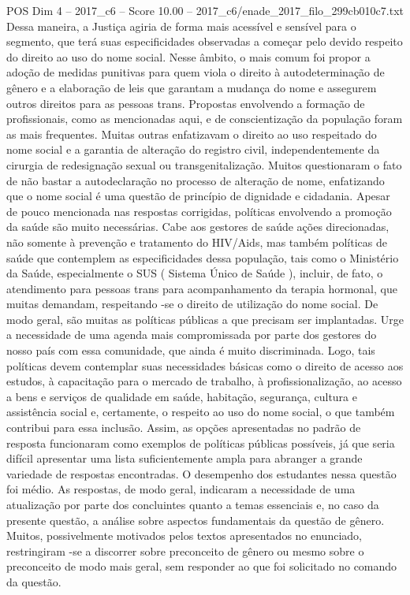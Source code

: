\begin{textsample}{POS Dim 4 – 2017\_c6 – Score 10.00 – 2017\_c6/enade\_2017\_filo\_299cb010c7.txt}
Dessa maneira, a Justiça agiria de forma mais acessível e sensível para o segmento, que terá suas especificidades observadas a começar pelo devido respeito do direito ao uso do nome social.
Nesse âmbito, o mais comum foi propor a adoção de medidas punitivas para quem viola o direito à autodeterminação de gênero e a elaboração de leis que garantam a mudança do nome e assegurem outros direitos para as pessoas trans.
Propostas envolvendo a formação de profissionais, como as mencionadas aqui, e de conscientização da população foram as mais frequentes.
Muitas outras enfatizavam o direito ao uso respeitado do nome social e a garantia de alteração do registro civil, independentemente da cirurgia de redesignação sexual ou transgenitalização.
Muitos questionaram o fato de não bastar a autodeclaração no processo de alteração de nome, enfatizando que o nome social é uma questão de princípio de dignidade e cidadania.
Apesar de pouco mencionada nas respostas corrigidas, políticas envolvendo a promoção da saúde são muito necessárias.
Cabe aos gestores de saúde ações direcionadas, não somente à prevenção e tratamento do HIV/Aids, mas também políticas de saúde que contemplem as especificidades dessa população, tais como o Ministério da Saúde, especialmente o SUS ( Sistema Único de Saúde ), incluir, de fato, o atendimento para pessoas trans para acompanhamento da terapia hormonal, que muitas demandam, respeitando -se o direito de utilização do nome social.
De modo geral, são muitas as políticas públicas a que precisam ser implantadas.
Urge a necessidade de uma agenda mais compromissada por parte dos gestores do nosso país com essa comunidade, que ainda é muito discriminada.
Logo, tais políticas devem contemplar suas necessidades básicas como o direito de acesso aos estudos, à capacitação para o mercado de trabalho, à profissionalização, ao acesso a bens e serviços de qualidade em saúde, habitação, segurança, cultura e assistência social e, certamente, o respeito ao uso do nome social, o que também contribui para essa inclusão.
Assim, as opções apresentadas no padrão de resposta funcionaram como exemplos de políticas públicas possíveis, já que seria difícil apresentar uma lista suficientemente ampla para abranger a grande variedade de respostas encontradas.
O desempenho dos estudantes nessa questão foi médio.
As respostas, de modo geral, indicaram a necessidade de uma atualização por parte dos concluintes quanto a temas essenciais e, no caso da presente questão, a análise sobre aspectos fundamentais da questão de gênero.
Muitos, possivelmente motivados pelos textos apresentados no enunciado, restringiram -se a discorrer sobre preconceito de gênero ou mesmo sobre o preconceito de modo mais geral, sem responder ao que foi solicitado no comando da questão.

\end{textsample}
